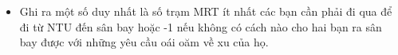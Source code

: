 \begin{itemize}
	\item     Ghi ra một số duy nhất là         số trạm MRT ít nhất        các bạn cần phải đi qua để đi từ NTU đến sân bay hoặc -1 nếu không có cách nào cho hai bạn ra sân bay được với những yêu cầu oái oăm về xu của họ.   
\end{itemize}